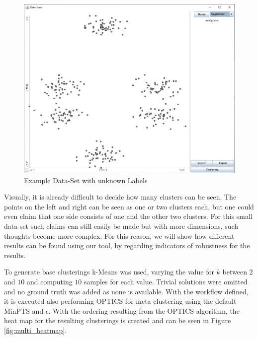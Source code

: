 \documentclass[
	a4paper,
	english,
	twoside,
	openright,               
	11pt                            
	]{report}
\begin{document}
\begin{figure}[h]
	\centering
	\includegraphics[scale=.4]{multi}
	\caption{Example Data-Set with unknown Labels}
	\label{fig:multi}
\end{figure}

Visually, it is already difficult to decide how many clusters can be seen. The points on the left and right can be seen as one or two clusters each, but one could even claim that one side consists of one and the other two clusters. For this small data-set such claims can still easily be made but with more dimensions, such thoughts become more complex. For this reason, we will show how different results can be found using our tool, by regarding indicators of robustness for the results.

To generate base clusterings k-Means was used, varying the value for $k$ between $2$ and $10$ and computing $10$ samples for each value. Trivial solutions were omitted and no ground truth was added as none is available. With the workflow defined, it is executed also performing OPTICS for meta-clustering using the default MinPTS and $\epsilon$. With the ordering resulting from the OPTICS algorithm, the heat map for the resulting clusterings is created and can be seen in Figure \ref{fig:multi_heatmap}.
\end{document}
